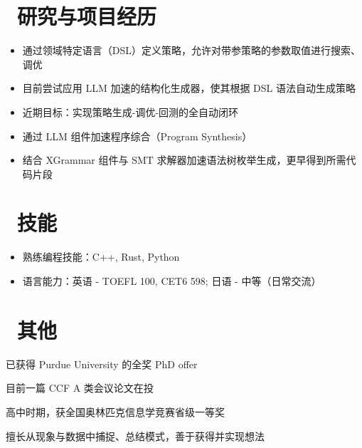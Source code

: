 \documentclass{resume}
\begin{document}
\section{\faCogs\ 研究与项目经历}

\begin{itemize}[parsep=0.5ex]
  \item 通过领域特定语言（DSL）定义策略，允许对带参策略的参数取值进行搜索、调优
  \item 目前尝试应用 LLM 加速的结构化生成器，使其根据 DSL 语法自动生成策略
  \item 近期目标：实现策略生成-调优-回测的全自动闭环
\end{itemize}

\begin{itemize}[parsep=0.5ex]
  \item 通过 LLM 组件加速程序综合（Program Synthesis）
  \item 结合 XGrammar 组件与 SMT 求解器加速语法树枚举生成，更早得到所需代码片段
\end{itemize}

\section{\faCogs\ 技能}
\begin{itemize}[parsep=0.5ex]
  \item 熟练编程技能：C++, Rust, Python
  \item 语言能力：英语 - TOEFL 100, CET6 598; 日语 - 中等（日常交流）
\end{itemize}

\section{\faInfo\ 其他}
\begin{description}[parsep=0.5ex]
  \item[升学] 已获得 Purdue University 的全奖 PhD offer
  \item[论文] 目前一篇 CCF A 类会议论文在投
  \item[竞赛] 高中时期，获全国奥林匹克信息学竞赛省级一等奖
  \item[特长] 擅长从现象与数据中捕捉、总结模式，善于获得并实现想法
\end{description}
\end{document}
